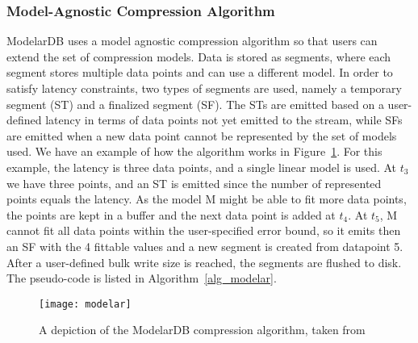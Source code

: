 \subsubsection{Model-Agnostic Compression Algorithm}
ModelarDB uses a model agnostic compression algorithm so that users can extend the set of
compression models. Data is stored as segments, where each segment stores multiple data
points and can use a different model. In order to satisfy latency constraints, two types
of segments are used, namely a temporary segment (ST) and a finalized segment (SF).
The STs are emitted based on a user-defined latency in terms of data points not yet
emitted to the stream, while SFs are emitted when a new data point cannot be represented
by the set of models used.
We have an example of how the algorithm works in Figure~\ref{modelar}. For this example,
the latency is three data points, and a single linear model is used. At $t_3$  we have three
points, and an ST is emitted since the number of represented points equals the latency.
As the model M might be able to fit more data points, the points are kept in a buffer and
the next data point is added at $t_4$. At $t_5$, M cannot fit all data points within the
user-specified error bound, so it emits then an SF with the 4 fittable values and a
new segment is created from datapoint 5. After a user-defined bulk write size is
reached,  the segments are flushed to disk.
The pseudo-code is listed in Algorithm~\ref{alg_modelar}.
\begin{figure}
\begin{center}
\texttt{[image: modelar]}
\caption[modelar]{A depiction of the ModelarDB compression algorithm, taken from \cite{jensen2018modelardb}}
\label{modelar}
\end{center}
\end{figure}
